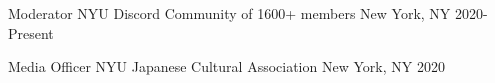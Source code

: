 



\begin{cvhonors}

  \cvhonor
    {Moderator} %
    {NYU Discord Community of 1600+ members} %
    {New York, NY} %
    {2020-Present} %
    
  \cvhonor
    {Media Officer} %
    {NYU Japanese Cultural Association} %
    {New York, NY} %
    {2020} %

\end{cvhonors}


